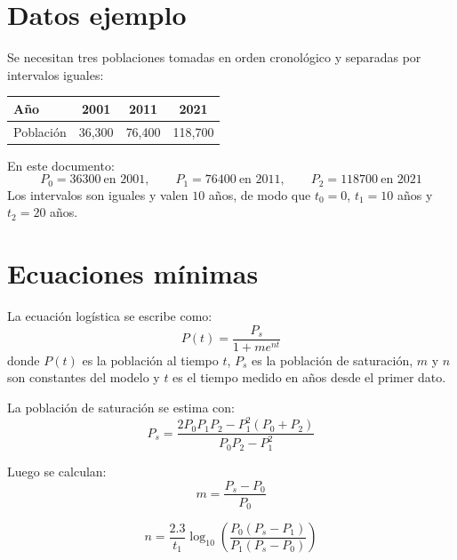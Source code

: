 \documentclass[12pt]{article}
\begin{document}

\section{Datos ejemplo}
Se necesitan tres poblaciones tomadas en orden cronológico y separadas por intervalos iguales:

\begin{center}
\begin{tabular}{lccc}
\toprule
Año & 2001 & 2011 & 2021 \\
\midrule
Población & 36,300 & 76,400 & 118,700 \\
\bottomrule
\end{tabular}
\end{center}

En este documento:
\[
P_0=\num{36300}\ \text{en 2001},\qquad P_1=\num{76400}\ \text{en 2011},\qquad P_2=\num{118700}\ \text{en 2021}
\]
Los intervalos son iguales y valen $10$ años, de modo que $t_0=0$, $t_1=10$ años y $t_2=20$ años.

\section{Ecuaciones mínimas}
La ecuación logística se escribe como:
\begin{equation}
P(t)=\frac{P_s}{1+me^{nt}}
\end{equation}
donde $P(t)$ es la población al tiempo $t$, $P_s$ es la población de saturación, $m$ y $n$ son constantes del modelo y $t$ es el tiempo medido en años desde el primer dato.

La población de saturación se estima con:
\begin{equation}
P_s=\frac{2P_0P_1P_2-P_1^2(P_0+P_2)}{P_0P_2-P_1^2}
\end{equation}

Luego se calculan:
\begin{equation}
m=\frac{P_s-P_0}{P_0}
\end{equation}

\begin{equation}
n=\frac{2.3}{t_1}\log_{10}\left(\frac{P_0(P_s-P_1)}{P_1(P_s-P_0)}\right)
\end{equation}
\end{document}
